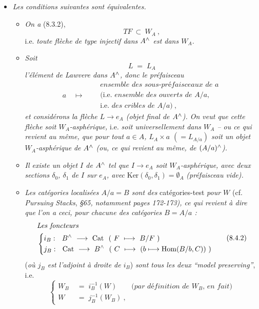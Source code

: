 \begin{itemize}[leftmargin=*]
\item[1$^\circ$)] \textit{Les conditions suivantes sont équivalentes.}
\begin{itemize}[leftmargin=*]
\item[a)] \textit{On a} (8.3.2),
\[
TF\ \subset\ W_A\ ,
\]
i.e. \textit{toute flèche de type injectif dans $A^{\wedge}$ est dans $W_A$.}
\item[b)] \textit{Soit}
\[
L \;=\; L_A
\tag*{(8.4.1)}
\]
\textit{l'élément de Lawvere dans $A^{\wedge}$, donc le préfaisceau}
\[
a \quad\longmapsto\quad
\begin{aligned}
&\textit{ensemble des sous-préfaisceaux de $a$}\\
&(\text{i.e. }\textit{ensemble des ouverts de $A/a$},\\
&\text{i.e. }\textit{des cribles de $A/a$})\ ,
\end{aligned}
\]
\textit{et considérons la flèche $L\longrightarrow e_A$ (objet final de $A^{\wedge}$). On veut que cette flèche soit $W_A$-asphérique,} i.e. \textit{soit universellement dans $W_A$ -- ou ce qui revient au même, que pour tout $a\in A$, $L_A\times a$ $(=L_{A/a})$ soit un objet $W_A$-asphérique}
\textit{de $A^{\wedge}$ (ou, ce qui revient au même, de $(A/a)^{\wedge}$).}
\item[c)] \textit{Il existe un objet $I$ de $A^{\wedge}$ tel que $I\longrightarrow e_A$ soit $W_A$-asphérique, avec deux sections $\delta_0$, $\delta_1$ de $I$ sur $e_A$, avec} $\mathrm{Ker}(\delta_0,\delta_1)=\emptyset_A$ \textit{(préfaisceau vide).}
\item[d)] \textit{Les catégories localisées $A/a=B$ sont des} catégories-test \textit{pour $W$} (cf. \textit{Pursuing Stacks}, \textit{§65, notamment pages 172-173), ce qui revient à dire que l'on a ceci, pour chacune des catégories $B=A/a$ :}
\[
\begin{aligned}
&\textit{Les foncteurs}\\
&\left\{
\begin{aligned}
&i_B:\ \ B\chap \ \longrightarrow\ \Cat\ \ (\ F\ \longmapsto\ B/F\ )\\
&j_B:\ \ \Cat\ \longrightarrow\ B\chap\ \ (\ C\ \longmapsto\ (b\longmapsto \mathrm{Hom}(B/b,C))\ )
\end{aligned}
\right.
\end{aligned}
\tag*{(8.4.2)}
\]
(\textit{où $j_B$ est l'adjoint à droite de $i_B$}) \textit{sont tous les deux ``model preserving''}, i.e.
\[
\left\{
\begin{aligned}
W_B \;&=\; i_B^{-1}(W) \qquad \textit{(par définition de $W_B$, en fait)}\\
W \;&=\; j_B^{-1}(W_B)\ ,
\end{aligned}
\right.
\tag*{(8.4.3)}
\]
\end{itemize}
\end{itemize}

